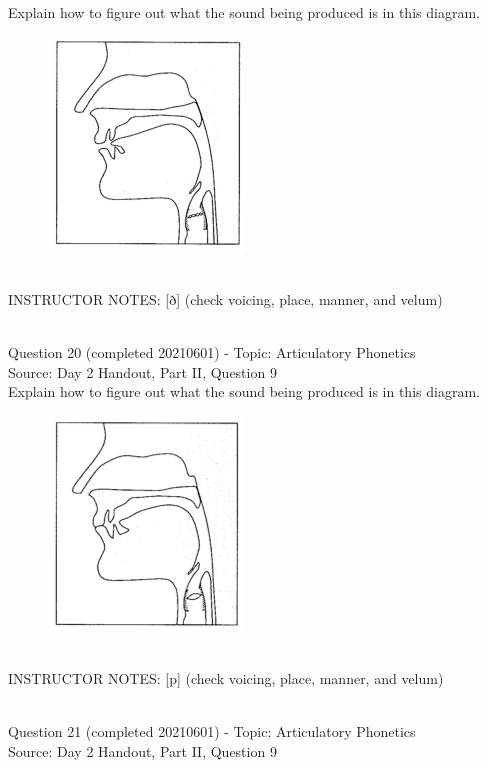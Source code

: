 \documentclass[12pt]{article}
\begin{document}
Explain how to figure out what the sound being produced is in this diagram.\\

\begin{figure}[H]
\includegraphics{../images/sagittal_eth.png}
\end{figure}

~\\
INSTRUCTOR NOTES: [ð] (check voicing, place, manner, and velum)


~\\

{\large Question 20} (completed 20210601) - Topic: Articulatory Phonetics\\
Source: Day 2 Handout, Part II, Question 9\\

Explain how to figure out what the sound being produced is in this diagram.\\

\begin{figure}[H]
\includegraphics{../images/sagittal_p.png}
\end{figure}

~\\
INSTRUCTOR NOTES: [p] (check voicing, place, manner, and velum)


~\\

{\large Question 21} (completed 20210601) - Topic: Articulatory Phonetics\\
Source: Day 2 Handout, Part II, Question 9\\
\end{document}
